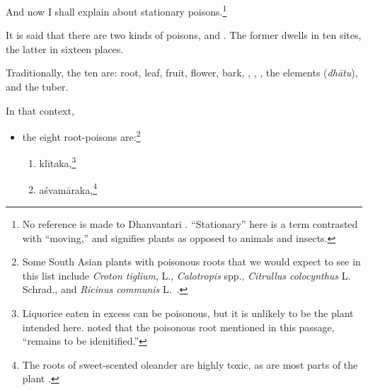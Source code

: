 \begin{translation}
    
\item[1]

And now I shall explain 
about stationary poisons.\footnote{No reference is made to
    Dhanvantari \citep[see][]{birc-2021}. “Stationary” here is a term
    contrasted with “moving,” and signifies plants as opposed to animals
    and insects.}
  
    \item[3]
    \noindent It is said that there are two kinds of poisons,
     and . The former
    dwells in ten sites, the latter in sixteen places.
   
    \item[4]
    Traditionally, the ten are: root, leaf, fruit, flower, bark,
    , , , the
    elements (\emph{dhātu}), and the tuber.

    \item[5]
    
    In that context,\label{poisonousplants}
    \begin{itemize}
        \item the eight root-poisons are:\footnote{Some South Asian
    plants with poisonous roots that we would expect to see in
    this list include \emph{Croton tiglium}, L., \emph{Calotropis}
    spp., \emph{Citrullus colocynthus} L. Schrad., and
    \emph{Ricinus communis} L.\ \citep{pill-2010}.} %
        \begin{enumerate}
            
        \item  \gls{klītaka},\footnote{Liquorice eaten in excess can
    be poisonous, but it is unlikely to be the plant intended
    here.  \citet[124]{gvdb} noted that the poisonous root
    mentioned in this passage, “remains to be idenitified.”}
       
        \item \gls{aśvamāraka},\footnote{The roots of sweet-scented
    oleander are highly toxic, as are most parts of the plant
    \citep{pill-2019}.}
    

\end{enumerate}
\end{itemize}
\end{translation}
